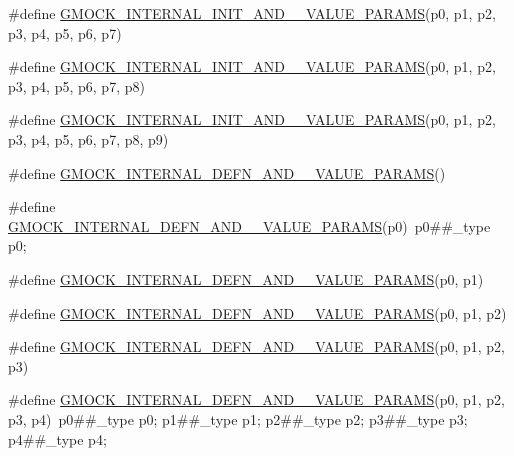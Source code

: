 \begin{DoxyCompactItemize}
\item 
\#define \hyperlink{gmock-generated-actions_8h_a12a0e970438c008214093b98b8eefa68}{G\+M\+O\+C\+K\+\_\+\+I\+N\+T\+E\+R\+N\+A\+L\+\_\+\+I\+N\+I\+T\+\_\+\+A\+N\+D\+\_\+\_\+\+V\+A\+L\+U\+E\+\_\+\+P\+A\+R\+A\+MS}(p0,  p1,  p2,  p3,  p4,  p5,  p6,  p7)
\item 
\#define \hyperlink{gmock-generated-actions_8h_aa69890581b384540649239847bd7dcbf}{G\+M\+O\+C\+K\+\_\+\+I\+N\+T\+E\+R\+N\+A\+L\+\_\+\+I\+N\+I\+T\+\_\+\+A\+N\+D\+\_\+\_\+\+V\+A\+L\+U\+E\+\_\+\+P\+A\+R\+A\+MS}(p0,  p1,  p2,  p3,  p4,  p5,  p6,  p7,  p8)
\item 
\#define \hyperlink{gmock-generated-actions_8h_aeed917d405a99878e11d53b8eca2b744}{G\+M\+O\+C\+K\+\_\+\+I\+N\+T\+E\+R\+N\+A\+L\+\_\+\+I\+N\+I\+T\+\_\+\+A\+N\+D\+\_\+\_\+\+V\+A\+L\+U\+E\+\_\+\+P\+A\+R\+A\+MS}(p0,  p1,  p2,  p3,  p4,  p5,  p6,  p7,  p8,  p9)
\item 
\#define \hyperlink{gmock-generated-actions_8h_a3fef729577c726683358d924c3d31c18}{G\+M\+O\+C\+K\+\_\+\+I\+N\+T\+E\+R\+N\+A\+L\+\_\+\+D\+E\+F\+N\+\_\+\+A\+N\+D\+\_\+\_\+\+V\+A\+L\+U\+E\+\_\+\+P\+A\+R\+A\+MS}()
\item 
\#define \hyperlink{gmock-generated-actions_8h_a9a2a07e6eff8e4ca6d45b8f7ea11cf3b}{G\+M\+O\+C\+K\+\_\+\+I\+N\+T\+E\+R\+N\+A\+L\+\_\+\+D\+E\+F\+N\+\_\+\+A\+N\+D\+\_\+\_\+\+V\+A\+L\+U\+E\+\_\+\+P\+A\+R\+A\+MS}(p0)~p0\#\#\+\_\+type p0;
\item 
\#define \hyperlink{gmock-generated-actions_8h_a16aa4a04e77951b00534396170438deb}{G\+M\+O\+C\+K\+\_\+\+I\+N\+T\+E\+R\+N\+A\+L\+\_\+\+D\+E\+F\+N\+\_\+\+A\+N\+D\+\_\+\_\+\+V\+A\+L\+U\+E\+\_\+\+P\+A\+R\+A\+MS}(p0,  p1)
\item 
\#define \hyperlink{gmock-generated-actions_8h_a584f78b5777db084208f151d7e4d51b7}{G\+M\+O\+C\+K\+\_\+\+I\+N\+T\+E\+R\+N\+A\+L\+\_\+\+D\+E\+F\+N\+\_\+\+A\+N\+D\+\_\+\_\+\+V\+A\+L\+U\+E\+\_\+\+P\+A\+R\+A\+MS}(p0,  p1,  p2)
\item 
\#define \hyperlink{gmock-generated-actions_8h_a1c04daeff7ae92839f33727e264f227f}{G\+M\+O\+C\+K\+\_\+\+I\+N\+T\+E\+R\+N\+A\+L\+\_\+\+D\+E\+F\+N\+\_\+\+A\+N\+D\+\_\+\_\+\+V\+A\+L\+U\+E\+\_\+\+P\+A\+R\+A\+MS}(p0,  p1,  p2,  p3)
\item 
\#define \hyperlink{gmock-generated-actions_8h_ae8e67227205c5f57cbe9c885271d8f82}{G\+M\+O\+C\+K\+\_\+\+I\+N\+T\+E\+R\+N\+A\+L\+\_\+\+D\+E\+F\+N\+\_\+\+A\+N\+D\+\_\+\_\+\+V\+A\+L\+U\+E\+\_\+\+P\+A\+R\+A\+MS}(p0,  p1,  p2,  p3,  p4)~p0\#\#\+\_\+type p0; p1\#\#\+\_\+type p1; p2\#\#\+\_\+type p2; p3\#\#\+\_\+type p3; p4\#\#\+\_\+type p4;

\end{DoxyCompactItemize}
